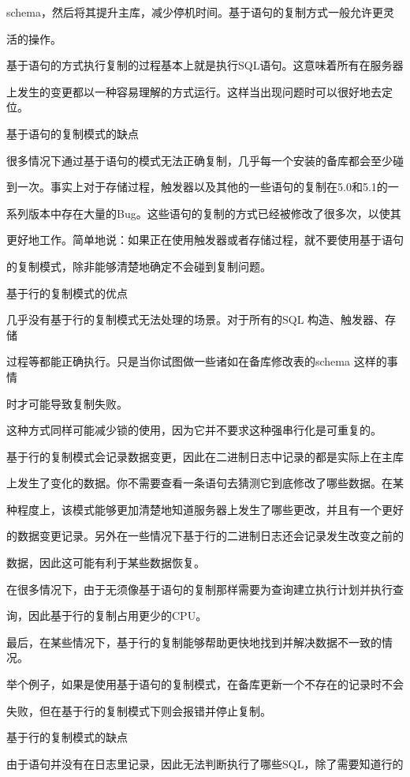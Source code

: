 schema，然后将其提升主库，减少停机时间。基于语句的复制方式一般允许更灵

活的操作。

基于语句的方式执行复制的过程基本上就是执行SQL语句。这意味着所有在服务器

上发生的变更都以一种容易理解的方式运行。这样当出现问题时可以很好地去定位。

基于语句的复制模式的缺点

很多情况下通过基于语句的模式无法正确复制，几乎每一个安装的备库都会至少碰

到一次。事实上对于存储过程，触发器以及其他的一些语句的复制在5.0和5.1的一

系列版本中存在大量的Bug。这些语句的复制的方式已经被修改了很多次，以使其

更好地工作。简单地说：如果正在使用触发器或者存储过程，就不要使用基于语句

的复制模式，除非能够清楚地确定不会碰到复制问题。

基于行的复制模式的优点

几乎没有基于行的复制模式无法处理的场景。对于所有的SQL 构造、触发器、存储

过程等都能正确执行。只是当你试图做一些诸如在备库修改表的schema 这样的事情

时才可能导致复制失败。

这种方式同样可能减少锁的使用，因为它并不要求这种强串行化是可重复的。

基于行的复制模式会记录数据变更，因此在二进制日志中记录的都是实际上在主库

上发生了变化的数据。你不需要查看一条语句去猜测它到底修改了哪些数据。在某

种程度上，该模式能够更加清楚地知道服务器上发生了哪些更改，并且有一个更好

的数据变更记录。另外在一些情况下基于行的二进制日志还会记录发生改变之前的

数据，因此这可能有利于某些数据恢复。

在很多情况下，由于无须像基于语句的复制那样需要为查询建立执行计划并执行查

询，因此基于行的复制占用更少的CPU。

最后，在某些情况下，基于行的复制能够帮助更快地找到并解决数据不一致的情况。

举个例子，如果是使用基于语句的复制模式，在备库更新一个不存在的记录时不会

失败，但在基于行的复制模式下则会报错并停止复制。

基于行的复制模式的缺点

由于语句并没有在日志里记录，因此无法判断执行了哪些SQL，除了需要知道行的

